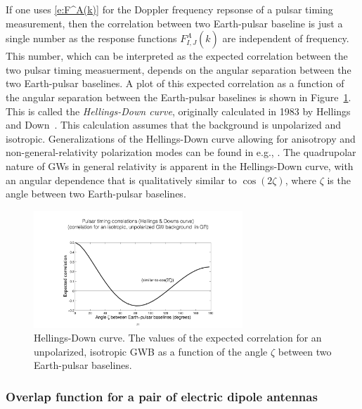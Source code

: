 If one uses \eqref{e:F^A(k)} for the Doppler frequency
repsonse of a pulsar timing measurement, then the correlation
between two Earth-pulsar baseline is just a single number as 
the response functions $F^A_{I,J}(\hat k)$ are independent of
frequency.
This number, which can be interpreted as the expected
correlation between the two pulsar timing measuerment, 
depends on the angular separation between the two 
Earth-pulsar baselines.
A plot of this expected correlation as a function of the 
angular separation between the Earth-pulsar baselines is
shown in Figure~\ref{f:HD_curve}.
This is called the {\em Hellings-Down curve}, originally 
calculated in 1983 by Hellings and Down~\cite{Hellings-Down:1983}.
This calculation assumes that the background is unpolarized
and isotropic.
Generalizations of the Hellings-Down curve allowing for 
anisotropy and non-general-relativity polarization modes
can be found in e.g., \cite{Mingarelli-et-al, Lee-et-al}.
The quadrupolar nature of GWs in general relativity is
apparent in the Hellings-Down curve, with an angular dependence
that is qualitatively similar to $\cos(2\zeta)$, where 
$\zeta$ is the angle between two Earth-pulsar baselines.
%
\begin{figure}[htbp!]
\begin{center}
\includegraphics[width=0.7\textwidth]{Figures/HD_curve}
\caption{Hellings-Down curve.
The values of the expected correlation for an unpolarized,
isotropic GWB as a function of the angle $\zeta$ between
two Earth-pulsar baselines.}
\label{f:HD_curve}
\end{center}
\end{figure}

\subsubsection{Overlap function for a pair of electric dipole 
antennas}

